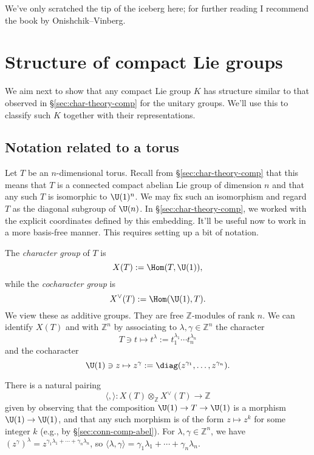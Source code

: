 \documentclass[reqno]{amsart} 
\begin{document}
We've only scratched the tip of the iceberg here; for further reading I recommend the book by Onishchik--Vinberg.

\newpage


\section{Structure of compact Lie groups}
We aim next to show that any compact Lie group $K$ has structure similar to that observed in \S\ref{sec:char-theory-comp} for the unitary groups.  We'll use this to classify such $K$ together with their representations.

\subsection{Notation related to a torus}\label{sec:notat-relat-torus}
Let $T$ be an $n$-dimensional torus.  Recall from \S\ref{sec:char-theory-comp} that this means that $T$ is a connected compact abelian Lie group of dimension $n$ and that any such $T$ is isomorphic to $\U(1)^n$.  We may fix such an isomorphism and regard $T$ as the diagonal subgroup of $\U(n)$.  In \S\ref{sec:char-theory-comp}, we worked with the explicit coordinates defined by this embedding.  It'll be useful now to work in a more basis-free manner.  This requires setting up a bit of notation.


The \emph{character group} of $T$ is
\begin{equation*}
  X(T) := \Hom(T,\U(1)),
\end{equation*}
while the \emph{cocharacter group} is
\begin{equation*}
  X^\vee (T) := \Hom(\U(1),T).
\end{equation*}
We view these as additive groups.  They are free $\mathbb{Z}$-modules of rank $n$.  We can identify $X(T)$ and with $\mathbb{Z}^n$ by associating to $\lambda, \gamma \in \mathbb{Z}^n$ the character
\begin{equation*}
  T \ni t \mapsto t^{\lambda} := t_1^{\lambda_1} \dotsb t_n^{\lambda_n}
\end{equation*}
and the cocharacter
\begin{equation*}
  \U(1) \ni z \mapsto z^{\gamma} := \diag(z^{\gamma_1},\dotsc,z^{\gamma_n}).
\end{equation*}

There is a natural pairing
\begin{equation*}
  \langle , \rangle : X(T) \otimes_{\mathbb{Z}} X^\vee(T) \rightarrow \mathbb{Z}
\end{equation*}
given by observing that the composition $\U(1) \rightarrow T \rightarrow \U(1)$ is a morphism $\U(1) \rightarrow \U(1)$, and that any such morphism is of the form $z \mapsto z^k$ for some integer $k$ (e.g., by \S\ref{sec:conn-comp-abel}).  For $\lambda, \gamma \in \mathbb{Z}^n$, we have $(z^\gamma)^{\lambda} = z^{\gamma_1 \lambda_1 + \dotsb + \gamma_n \lambda_n}$, so $\langle \lambda, \gamma \rangle = \gamma_1 \lambda_1 + \dotsb + \gamma_n \lambda_n$.
\end{document}
